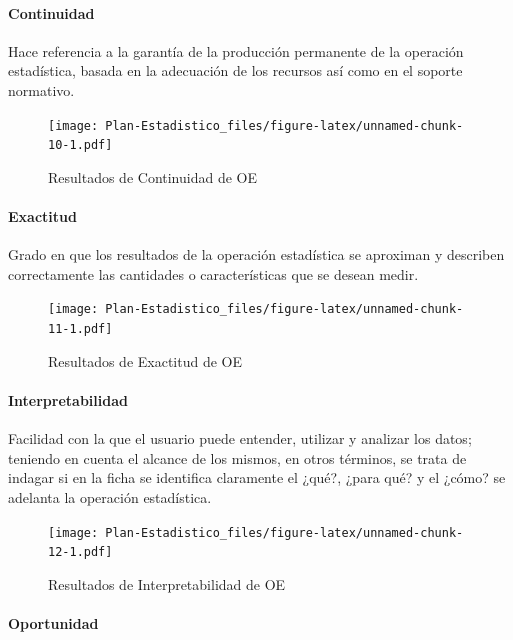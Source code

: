 \documentclass[
]{book}
\begin{document}
\hypertarget{continuidad}{%
\paragraph{Continuidad}\label{continuidad}}

Hace referencia a la garantía de la producción permanente de la operación
estadística, basada en la adecuación de los recursos así como en el soporte normativo.

\begin{figure}
\centering
\texttt{[image: Plan-Estadistico\_files/figure-latex/unnamed-chunk-10-1.pdf]}
\caption{\label{fig:unnamed-chunk-10}Resultados de Continuidad de OE}
\end{figure}

\hypertarget{exactitud}{%
\paragraph{Exactitud}\label{exactitud}}

Grado en que los resultados de la operación estadística se aproximan y describen correctamente las cantidades o características que se desean medir.

\begin{figure}
\centering
\texttt{[image: Plan-Estadistico\_files/figure-latex/unnamed-chunk-11-1.pdf]}
\caption{\label{fig:unnamed-chunk-11}Resultados de Exactitud de OE}
\end{figure}

\hypertarget{interpretabilidad}{%
\paragraph{Interpretabilidad}\label{interpretabilidad}}

Facilidad con la que el usuario puede entender, utilizar y analizar los datos;
teniendo en cuenta el alcance de los mismos, en otros términos, se trata de indagar si en la ficha
se identifica claramente el ¿qué?, ¿para qué? y el ¿cómo? se adelanta la operación estadística.

\begin{figure}
\centering
\texttt{[image: Plan-Estadistico\_files/figure-latex/unnamed-chunk-12-1.pdf]}
\caption{\label{fig:unnamed-chunk-12}Resultados de Interpretabilidad de OE}
\end{figure}

\hypertarget{oportunidad}{%
\paragraph{Oportunidad}\label{oportunidad}}
\end{document}
